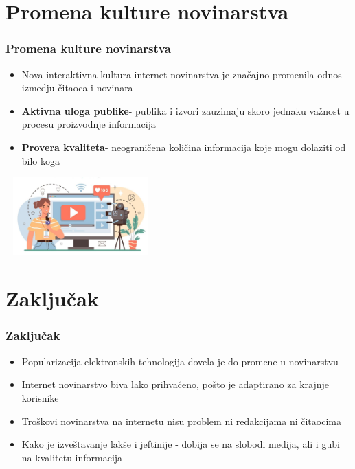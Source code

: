 \documentclass{beamer}
\begin{document}
\section{Promena kulture novinarstva}
\begin{frame}[fragile]\frametitle{Promena kulture novinarstva}
\transboxin
	\begin{itemize}	
		\item Nova interaktivna kultura internet novinarstva je značajno promenila odnos izmedju čitaoca i novinara
	\item {\bf Aktivna uloga publike}-  publika i izvori zauzimaju skoro jednaku važnost u procesu proizvodnje informacija
	\item {\bf Provera kvaliteta}- neograničena količina informacija koje mogu dolaziti od bilo koga
  \end{itemize}
  \begin{center}
      \includegraphics[height = 3cm, width = 5.8cm]{internet_novinarstvo.jpg}
  \end{center}
\end{frame}
\section{Zaključak}
\begin{frame}[fragile]\frametitle{Zaključak}
\transboxin
	\begin{itemize}	
		\item Popularizacija elektronskih tehnologija dovela je do promene u novinarstvu
        \item Internet novinarstvo biva lako prihvaćeno, pošto je adaptirano za krajnje korisnike
        \item Troškovi novinarstva na internetu nisu problem ni redakcijama ni čitaocima
        \item Kako je izveštavanje lakše i jeftinije - dobija se na slobodi medija, ali i gubi na kvalitetu informacija
	\end{itemize}
\end{frame}
\end{document}
